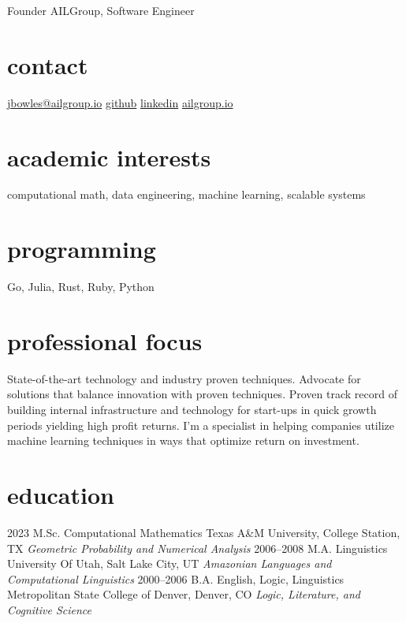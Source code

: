 \documentclass[]{friggeri-cv}
\begin{document}
       {Founder AILGroup, Software Engineer}

\begin{aside}
  \section{contact}
    \href{mailto:jbowles@ailgroup.io}{jbowles@ailgroup.io}
    \href{https://github.com/jbowles}{github}
    \href{https://www.linkedin.com/in/joshua-bowles-ailgroup/}{linkedin}
    \href{http://www.ailgroup.io/}{ailgroup.io}
  \section{academic interests}
  	computational math,
  	data engineering,
  	machine learning,
  	scalable systems
  \section{programming}
   	Go, Julia, Rust, 
     	Ruby, Python
\end{aside}

\section{professional focus}
State-of-the-art technology and industry proven techniques. Advocate for solutions that balance innovation with proven techniques. Proven track record of building internal infrastructure and technology for start-ups in quick growth periods yielding high profit returns. I’m a specialist in helping companies utilize machine learning techniques in ways that optimize return on investment.\\


\section{education}
\begin{entrylist}
  \entry
    {2023}
    {M.Sc. {\normalfont Computational Mathematics}}
    {Texas A\&M University, College Station, TX}
    {\emph{Geometric Probability and Numerical Analysis}}
  \entry
    {2006–2008}
    {M.A. {\normalfont Linguistics}}
    {University Of Utah, Salt Lake City, UT}
    {\emph{Amazonian Languages and Computational Linguistics}}  
  \entry
    {2000–2006}
    {B.A. {\normalfont English, Logic, Linguistics}}
    {Metropolitan State College of Denver, Denver, CO}
    {\emph{Logic, Literature, and Cognitive Science}}
\end{entrylist}
\end{document}
